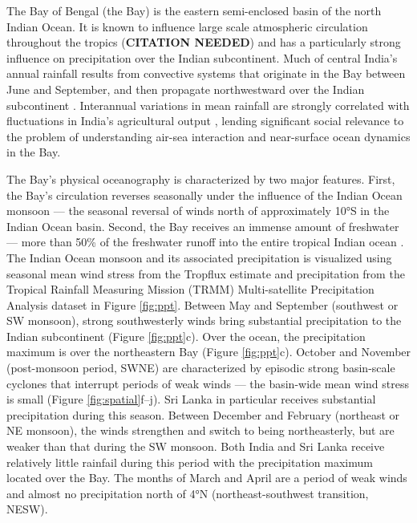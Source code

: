 \documentclass[twocol]{ametsoc}
\begin{document}
The Bay of Bengal (the Bay) is the eastern semi-enclosed basin of the north Indian Ocean.
It is known to influence large scale atmospheric circulation throughout the tropics (\textbf{CITATION NEEDED}) and has a particularly strong influence on precipitation over the Indian subcontinent.
Much of central India's annual rainfall results from convective systems that originate in the Bay between June and September, and then propagate northwestward over the Indian subcontinent \citep{Gadgil2003a}.
Interannual variations in mean rainfall are strongly correlated with fluctuations in India's agricultural output \citep{Gadgil2006}, lending significant social relevance to the problem of understanding air-sea interaction and near-surface ocean dynamics in the Bay.


The Bay's physical oceanography is characterized by two major features.
First, the Bay's circulation reverses seasonally under the influence of the Indian Ocean monsoon --- the seasonal reversal of winds north of approximately 10°S in the Indian Ocean basin.
Second, the Bay receives an immense amount of freshwater --- more than 50\% of the freshwater runoff into the entire tropical Indian ocean \citep{Sengupta2006,Gordon2016}.
The Indian Ocean monsoon and its associated precipitation is visualized using seasonal mean wind stress from the Tropflux estimate \citep{Kumar2012} and precipitation from the Tropical Rainfall Measuring Mission (TRMM) Multi-satellite Precipitation Analysis dataset \citep{trmm} in Figure \ref{fig:ppt}.
Between May and September (southwest or SW monsoon), strong southwesterly winds bring substantial precipitation to the Indian subcontinent (Figure \ref{fig:ppt}c).
Over the ocean, the precipitation maximum is over the northeastern Bay (Figure \ref{fig:ppt}c).
October and November (post-monsoon period, SWNE) are characterized by episodic strong basin-scale cyclones that interrupt periods of weak winds --- the basin-wide mean wind stress is small (Figure \ref{fig:spatial}f--j).
Sri Lanka in particular receives substantial precipitation during this season.
Between December and February (northeast or NE monsoon), the winds strengthen and switch to being northeasterly, but are weaker than that during the SW monsoon.
Both India and Sri Lanka receive relatively little rainfail during this period with the precipitation maximum located over the Bay.
The months of March and April are a period of weak winds and almost no precipitation north of 4°N (northeast-southwest transition, NESW).
\end{document}
